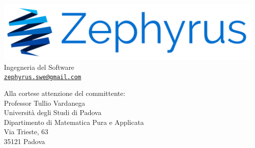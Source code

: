 \documentclass[a4paper,12pt]{letteracdp}
\author{Giulia Petenazzi}
\begin{document}
	\begin{flushleft}
	    \includegraphics[scale=0.10]{logo} \\
		Ingegneria del Software \\
		\href{mailto:zephyrus.swe@gmail.com}{\texttt{zephyrus.swe@gmail.com}}
	\end{flushleft}
	\vspace{0.5cm}
	\begin{flushright}
			Alla cortese attenzione del committente: \\
			Professor Tullio Vardanega \\
			Università degli Studi di Padova \\
			Dipartimento di Matematica Pura e Applicata\\
			Via Trieste, 63 \\
			35121 Padova
	\end{flushright}
\end{document}

